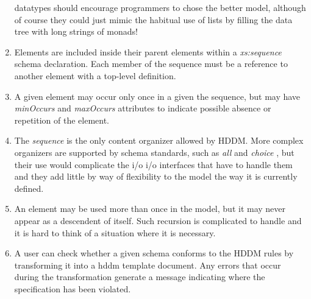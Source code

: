 \documentclass[10pt]{article}
\begin{document}
\begin{enumerate}
 datatypes should encourage programmers to chose the better model, although of course they could just mimic the habitual use of lists by filling the data tree with long strings of monads! 
\item  Elements are included inside their parent elements within a \emph{xs:sequence}
 schema declaration. Each member of the sequence must be a reference to another element with a top-level definition. 
\item  A given element may occur only once in a given the sequence, but may have \emph{minOccurs}
 and \emph{maxOccurs}
 attributes to indicate possible absence or repetition of the element. 
\item  The \emph{sequence}
 is the only content organizer allowed by HDDM. More complex organizers are supported by schema standards, such as \emph{all}
 and \emph{choice}
, but their use would complicate the i/o i/o interfaces that have to handle them and they add little by way of flexibility to the model the way it is currently defined. 
\item  An element may be used more than once in the model, but it may never appear as a descendent of itself. Such recursion is complicated to handle and it is hard to think of a situation where it is necessary. 
\item  A user can check whether a given schema conforms to the HDDM rules by transforming it into a hddm template document. Any errors that occur during the transformation generate a message indicating where the specification has been violated. 

\end{enumerate}
\end{document}
